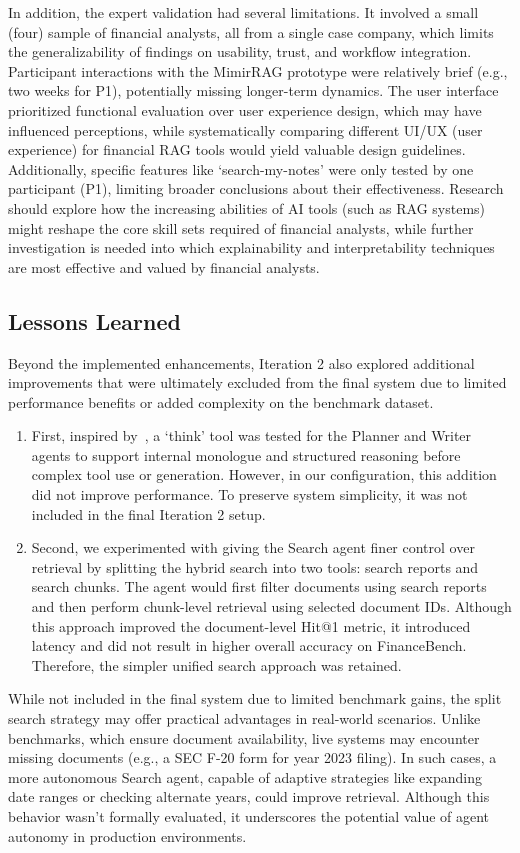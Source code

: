 \documentclass[final,5p,times,twopage,twocolumn,a4paper]{elsarticle}
\begin{document}
%
In addition, the expert validation had several limitations. It involved a small (four) sample of financial analysts, all from a single case company, which limits the generalizability of findings on usability, trust, and workflow integration. Participant interactions with the MimirRAG prototype were relatively brief (e.g., two weeks for P1), potentially missing longer-term dynamics. The user interface prioritized functional evaluation over user experience design, which may have influenced perceptions, while systematically comparing different UI/UX (user experience) for financial RAG tools would yield valuable design guidelines. Additionally, specific features like `search-my-notes' were only tested by one participant (P1), limiting broader conclusions about their effectiveness. Research should explore how the increasing abilities of AI tools (such as RAG systems) might reshape the core skill sets required of financial analysts, while further investigation is needed into which explainability and interpretability techniques are most effective and valued by financial analysts.


\subsection{Lessons Learned}
Beyond the implemented enhancements, Iteration 2 also explored additional improvements that were ultimately excluded from the final system due to limited performance benefits or added complexity on the benchmark dataset. 
\begin{enumerate}
    \item First, inspired by~\cite{Anthropic_2025}, a `think' tool was tested for the Planner and Writer agents to support internal monologue and structured reasoning before complex tool use or generation. However, in our configuration, this addition did not improve performance. To preserve system simplicity, it was not included in the final Iteration 2 setup.
    \item  Second, we experimented with giving the Search agent finer control over retrieval by splitting the hybrid search into two tools: search reports and search chunks. The agent would first filter documents using search reports and then perform chunk-level retrieval using selected document IDs. Although this approach improved the document-level Hit@1 metric, it introduced latency and did not result in higher overall accuracy on FinanceBench. Therefore, the simpler unified search approach was retained.
\end{enumerate}
%
While not included in the final system due to limited benchmark gains, the split search strategy may offer practical advantages in real-world scenarios. Unlike benchmarks, which ensure document availability, live systems may encounter missing documents (e.g., a SEC F-20 form for year 2023 filing). In such cases, a more autonomous Search agent, capable of adaptive strategies like expanding date ranges or checking alternate years, could improve retrieval. Although this behavior wasn't formally evaluated, it underscores the potential value of agent autonomy in production environments.
\end{document}
